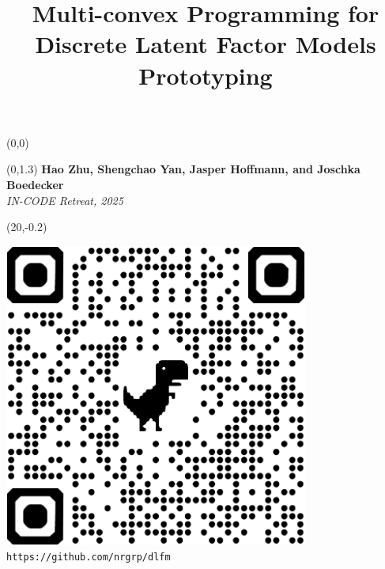 \documentclass[a0]{a0poster}
\begin{document}
\begin{textblock}{15}(0,0)
    \title{Multi-convex Programming for\\[0.1\baselineskip]Discrete Latent Factor Models Prototyping}
\end{textblock}

\begin{textblock}{15}(0,1.3)
    {\Large\bfseries Hao Zhu, Shengchao Yan, Jasper Hoffmann, and Joschka Boedecker}\\[0.5\baselineskip]
    {\Large\color{bluegray}\emph{IN-CODE Retreat, 2025}}
\end{textblock}

\begin{textblock}{3}(20,-0.2)
    \begin{center}
        \includegraphics[height=10cm]{media/dlfm_github.pdf}\\
        {\footnotesize\texttt{https://github.com/nrgrp/dlfm}}
    \end{center}
\end{textblock}
\end{document}
